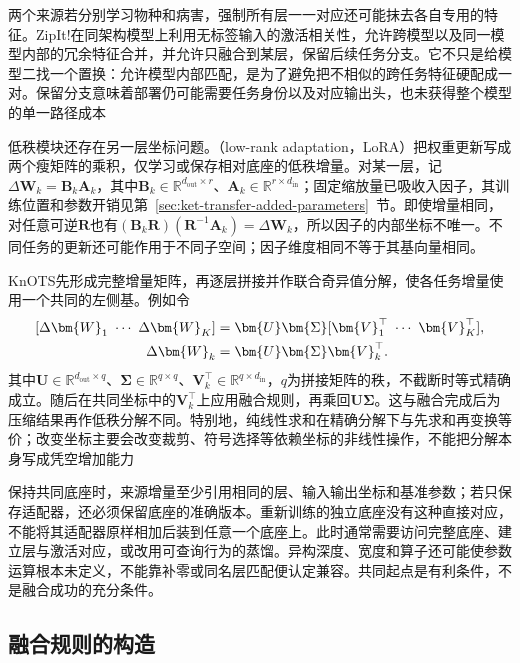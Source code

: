 两个来源若分别学习物种和病害，强制所有层一一对应还可能抹去各自专用的特征。ZipIt!在同架构模型上利用无标签输入的激活相关性，允许跨模型以及同一模型内部的冗余特征合并，并允许只融合到某层，保留后续任务分支。它不只是给模型二找一个置换：允许模型内部匹配，是为了避免把不相似的跨任务特征硬配成一对。保留分支意味着部署仍可能需要任务身份以及对应输出头，也未获得整个模型的单一路径成本

低秩模块还存在另一层坐标问题。（low-rank adaptation，LoRA）把权重更新写成两个瘦矩阵的乘积，仅学习或保存相对底座的低秩增量。对某一层，记$\Delta\bm{W}_k=\bm{B}_k\bm{A}_k$，其中$\bm{B}_k\in\mathbb{R}^{d_{\mathrm{out}}\times r}$、$\bm{A}_k\in\mathbb{R}^{r\times d_{\mathrm{in}}}$；固定缩放量已吸收入因子，其训练位置和参数开销见第~\ref{sec:ket-transfer-added-parameters}~节。即使增量相同，对任意可逆$\bm{R}$也有$(\bm{B}_k\bm{R})(\bm{R}^{-1}\bm{A}_k)=\Delta\bm{W}_k$，所以因子的内部坐标不唯一。不同任务的更新还可能作用于不同子空间；因子维度相同不等于其基向量相同。

KnOTS先形成完整增量矩阵，再逐层拼接并作联合奇异值分解，使各任务增量使用一个共同的左侧基。例如令
\begin{equation}
  \begin{aligned}
    \relax[\Delta\bm{W}_1\ \cdots\ \Delta\bm{W}_K]
      &=\bm{U}\bm{\Sigma}[\bm{V}_1^\top\ \cdots\ \bm{V}_K^\top],\\
    \Delta\bm{W}_k&=\bm{U}\bm{\Sigma}\bm{V}_k^\top.
  \end{aligned}
  \label{eq:ket-integration-knots}
\end{equation}
其中$\bm{U}\in\mathbb{R}^{d_{\mathrm{out}}\times q}$、$\bm{\Sigma}\in\mathbb{R}^{q\times q}$、$\bm{V}_k^\top\in\mathbb{R}^{q\times d_{\mathrm{in}}}$，$q$为拼接矩阵的秩，不截断时等式精确成立。随后在共同坐标中的$\bm{V}_k^\top$上应用融合规则，再乘回$\bm{U}\bm{\Sigma}$。这与融合完成后为压缩结果再作低秩分解不同。特别地，纯线性求和在精确分解下与先求和再变换等价；改变坐标主要会改变裁剪、符号选择等依赖坐标的非线性操作，不能把分解本身写成凭空增加能力

保持共同底座时，来源增量至少引用相同的层、输入输出坐标和基准参数；若只保存适配器，还必须保留底座的准确版本。重新训练的独立底座没有这种直接对应，不能将其适配器原样相加后装到任意一个底座上。此时通常需要访问完整底座、建立层与激活对应，或改用可查询行为的蒸馏。异构深度、宽度和算子还可能使参数运算根本未定义，不能靠补零或同名层匹配便认定兼容。共同起点是有利条件，不是融合成功的充分条件。

\subsection{融合规则的构造}
\label{sec:ket-integration-merging-rule}

